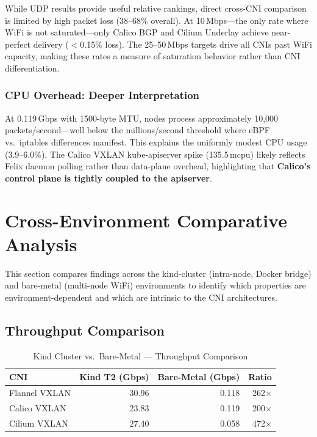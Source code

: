 \documentclass[11pt,a4paper]{article}
\begin{document}
While UDP results provide useful relative rankings, direct cross-CNI comparison is limited by high packet loss (38--68\% overall). At 10\,Mbps---the only rate where WiFi is not saturated---only Calico BGP and Cilium Underlay achieve near-perfect delivery ($<$0.15\% loss). The 25--50\,Mbps targets drive all CNIs past WiFi capacity, making these rates a measure of saturation behavior rather than CNI differentiation.

\subsubsection{CPU Overhead: Deeper Interpretation}

At 0.119\,Gbps with 1500-byte MTU, nodes process approximately 10,000 packets/second---well below the millions/second threshold where eBPF vs.\ iptables differences manifest. This explains the uniformly modest CPU usage (3.9--6.0\%). The Calico VXLAN kube-apiserver spike (135.5\,mcpu) likely reflects Felix daemon polling rather than data-plane overhead, highlighting that \textbf{Calico's control plane is tightly coupled to the apiserver}.


\newpage
\section{Cross-Environment Comparative Analysis}

This section compares findings across the kind-cluster (intra-node, Docker bridge) and bare-metal (multi-node WiFi) environments to identify which properties are environment-dependent and which are intrinsic to the CNI architectures.

\subsection{Throughput Comparison}

\begin{table}[H]
\centering
\caption{Kind Cluster vs.\ Bare-Metal --- Throughput Comparison}
\begin{tabular}{lrrr}
  \toprule
  \textbf{CNI} & \textbf{Kind T2 (Gbps)} & \textbf{Bare-Metal (Gbps)} & \textbf{Ratio} \\
  \midrule
  Flannel VXLAN & 30.96 & 0.118 & 262$\times$ \\
  Calico VXLAN  & 23.83 & 0.119 & 200$\times$ \\
  Cilium VXLAN  & 27.40 & 0.058 & 472$\times$ \\
  \bottomrule
\end{tabular}
\label{tab:cross-throughput}
\end{table}
\end{document}
